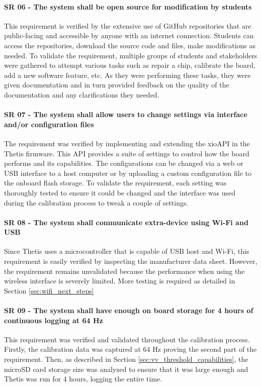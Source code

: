 \paragraph*{SR 06 - The system shall be open source for modification by students} This requirement is verified by the extensive use of GitHub repositories that are public-facing and accessible by anyone with an internet connection.
Students can access the repositories, download the source code and files, make modifications as needed.
To validate the requirement, multiple groups of students and stakeholders were gathered to attempt various tasks such as repair a chip, calibrate the board, add a new software feature, etc.
As they were performing these tasks, they were given documentation and in turn provided feedback on the quality of the documentation and any clarifications they needed.

\paragraph*{SR 07 - The system shall allow users to change settings via interface and/or configuration files} The requirement was verified by implementing and extending the xioAPI in the Thetis firmware.
This API provides a suite of settings to control how the board performs and its capabilities.
The configurations can be changed via a web or USB interface to a host computer or by uploading a custom configuration file to the onboard flash storage.
To validate the requirement, each setting was thoroughly tested to ensure it could be changed and the interface was used during the calibration process to tweak a couple of settings.

\paragraph*{SR 08 - The system shall communicate extra-device using Wi-Fi and USB} Since Thetis uses a microcontroller that is capable of USB host and Wi-Fi, this requirement is easily verified by inspecting the manufacturer data sheet.
However, the requirement remains unvalidated because the performance when using the wireless interface is severely limited.
More testing is required as detailed in Section \ref{sec:wifi_next_steps}

\paragraph*{SR 09 - The system shall have enough on board storage for 4 hours of continuous logging at 64 Hz} This requirement was verified and validated throughout the calibration process.
Firstly, the calibration data was captured at 64 Hz proving the second part of the requirement.
Then, as described in Section \ref{sec:vv_threshold_capabilities}, the microSD card storage size was analyzed to ensure that it was large enough and Thetis was run for 4 hours, logging the entire time.